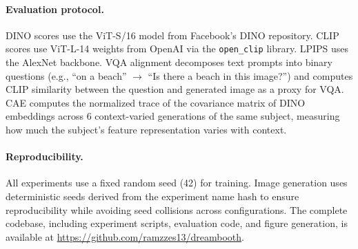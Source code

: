 \documentclass{article}
\begin{document}
\paragraph{Evaluation protocol.}
DINO scores use the ViT-S/16 model from Facebook's DINO repository.
CLIP scores use ViT-L-14 weights from OpenAI via the \texttt{open\_clip} library.
LPIPS uses the AlexNet backbone.
VQA alignment decomposes text prompts into binary questions (e.g., ``on a beach'' $\to$ ``Is there a beach in this image?'') and computes CLIP similarity between the question and generated image as a proxy for VQA.
CAE computes the normalized trace of the covariance matrix of DINO embeddings across 6 context-varied generations of the same subject, measuring how much the subject's feature representation varies with context.

\paragraph{Reproducibility.}
All experiments use a fixed random seed (42) for training.
Image generation uses deterministic seeds derived from the experiment name hash to ensure reproducibility while avoiding seed collisions across configurations.
The complete codebase, including experiment scripts, evaluation code, and figure generation, is available at \url{https://github.com/ramzzes13/dreambooth}.
\end{document}
